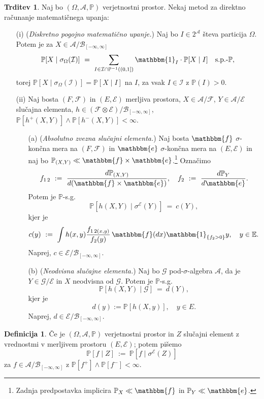 \documentclass[11pt]{article}
\renewcommand{\P}{\mathbb{P}}
\newcommand{\E}{\mathbb{E}}
\newcommand{\A}{\mathcal{A}}
\newcommand{\F}{\mathcal{F}}
\newcommand{\G}{\mathcal{G}}
\newcommand{\I}{\mathcal{I}}
\newcommand{\B}{\mathscr{B}}
\newcommand{\EE}{\mathcal{E}}
\newcommand{\set}[1]{\{#1\}}
\newcommand{\1}{\mathbbm{1}}
\newcommand{\e}{\mathbbm{e}}
\newcommand{\f}{\mathbbm{f}}
\newcommand{\rr}{[-\infty,\infty]}
\theoremstyle{definition}
\newtheorem{definicija}{Definicija}[section]
\theoremstyle{definition}
\newtheorem{trditev}{Trditev}[section]
\theoremstyle{definition}
\theoremstyle{definition}
\begin{document}
\begin{trditev}

Naj bo $(\Omega, \A, \P)$ verjetnostni prostor. Nekaj metod za direktno računanje matematičnega upanja:
\begin{enumerate}

\item[(i)] (\textit{Diskretno pogojno matematično upanje.}) Naj bo $I \in 2^\A$ števa particija $\Omega$. Potem je za $X \in \A/\B_{\rr}$
$$\P[X \mid \sigma_\Omega(\I)] ~=~ \sum_{I \in \I \cap \P^{-1}((0,1])} \1_I \cdot \P[X \mid I] \quad \text{s.p.-}\P,$$
torej $\P[X \mid \sigma_\Omega(\I)] = \P[X \mid I]$ na $I$, za vsak $I \in \I$ z $\P(I)>0$.

\item[(ii)] Naj bosta $(F,\F)$ in $(E,\EE)$ merljiva prostora, $X \in \A/\F$, $Y \in \A/\EE$ slučajna elementa, $h \in (\F\otimes\EE)/\B_{\rr}$, \hbox{$\P[h^+(X,Y)]\wedge\P[h^-(X,Y)]<\infty$.}
\begin{itemize}
	\item[(a)] (\textit{Absolutno zvezna slučajni elementa.}) Naj bosta $\f$ $\sigma$-končna mera na $(F,\F)$ in $\e$ $\sigma$-končna mera na $(E,\EE)$ in naj bo $\P_{(X,Y)} \ll \f \times \e$.\footnote{Zadnja predpostavka implicira $\P_X \ll \f$ in $\P_Y \ll \e$.} Označimo
	$$f_{1\,2} ~:=~ \frac{d\P_{(X,Y)}}{d(\f\times\e)}, \quad f_2 ~:=~ \frac{d\P_Y}{d\e}.$$ 
	Potem je $\P$-s.g.
	$$\P[h(X,Y) \mid \sigma^{\EE}(Y)] ~=~ c(Y),$$
	kjer je 
	$$c(y) ~:=~ \int h(x,y) \frac{f_{1\,2(x,y)}}{f_2(y)}\,\f(dx)\1_{\set{f_2>0}}y, \quad y \in \E.$$
	Naprej, $c \in \EE/\B_{\rr}$.
	\item[(b)] (\textit{Neodvisna slučajne elementa.}) Naj bo $\G$ pod-$\sigma$-algebra $\A$, da je $Y \in \G/\EE$ in $X$ neodvisna od $\G$. Potem je $\P$-s.g.
	$$\P[h(X,Y) \mid \G] ~=~ d(Y),$$
	kjer je 
	$$d(y) := \P[h(X,y)], \quad y \in E.$$
	Naprej, $d \in \EE/\B_{\rr}$.
\end{itemize} 

\end{enumerate}

\end{trditev}
\vspace{0.5cm}

\begin{definicija}

Če je $(\Omega, \A, \P)$ verjetnostni prostor in $Z$ slučajni element z vrednostmi v merljivem prostoru $(E,\EE)$; potem pišemo
$$\P[f \mid Z] ~:=~ \P[f \mid \sigma^\EE(Z)]$$
za $f \in \A/\B_{\rr}$ z $\P[f^+]\wedge\P[f^-]<\infty$.

\end{definicija}
\vspace{0.5cm}
\end{document}
